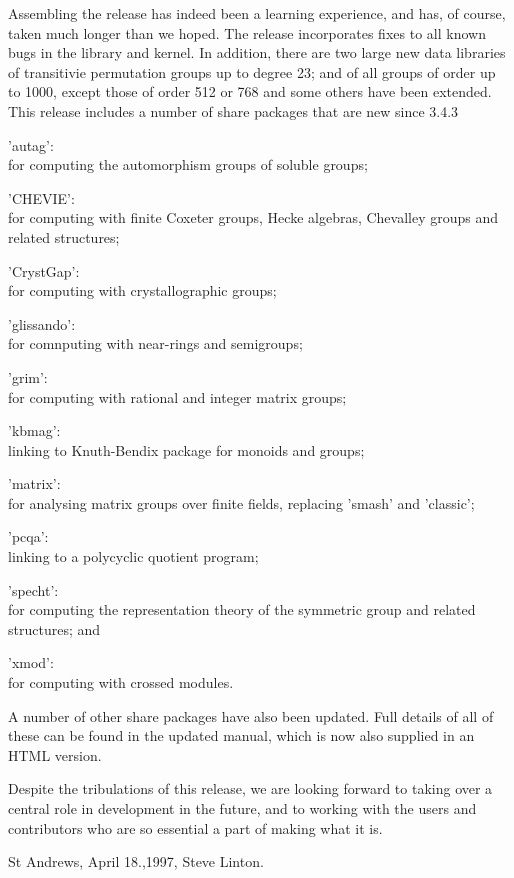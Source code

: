 Assembling the release has indeed been a learning experience, and has,
of course, taken much longer than we hoped. The release incorporates
fixes to all known bugs in the library and kernel. In addition, there
are two large new data libraries\: of transitivie permutation groups up
to degree 23; and of all groups of order up to 1000, except those of
order 512 or 768 and some others have been extended. This release
includes a number of share packages that are new since 3.4.3\: 

'autag':\\ for computing the automorphism groups of soluble groups;

'CHEVIE':\\ for computing with finite Coxeter groups, Hecke algebras,
Chevalley groups and related structures;

'CrystGap':\\ for computing with crystallographic groups;

'glissando':\\ for comnputing with near-rings and semigroups;

'grim':\\ for computing with rational and integer matrix groups;

'kbmag':\\ linking to Knuth-Bendix package for monoids and groups;

'matrix':\\ for analysing matrix groups over finite fields, replacing
'smash' and 'classic';

'pcqa':\\ linking to a polycyclic quotient program;

'specht':\\ for computing the representation theory of the symmetric
group and related structures; and

'xmod':\\ for computing with crossed modules. 

A number of other share packages have also been updated. Full details
of all of these can be found in the updated manual, which is now also
supplied in an HTML version.

Despite the tribulations of this release, we are looking forward to
taking over a central role in {\GAP} development in the future, and to
working with the users and contributors who are so essential a part of
making {\GAP} what it is.

St Andrews, April 18.,1997, \hfill Steve Linton.
\bigskip

